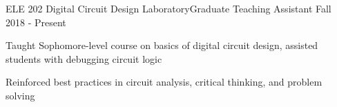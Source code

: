 \gradheader
\begin{cvprojectentries}
  {ELE 202 {\cdotp} Digital Circuit Design Laboratory}{Graduate Teaching Assistant}
  {Fall 2018 - Present}
  {
    \begin{cvitems}
        \item{Taught Sophomore-level course on basics of digital circuit design, assisted students with debugging circuit logic}
        \item{Reinforced best practices in circuit analysis, critical thinking, and problem solving}
    \end{cvitems}
  }
\end{cvprojectentries}
